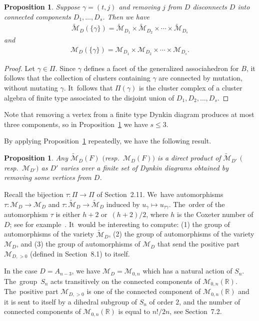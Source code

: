 \documentclass[10pt,a4paper]{amsart}
\def\R{{\mathbb R}}
\def\M{{\mathcal{M}}}
\def\tM{{\widetilde {\mathcal{M}}}}
\numberwithin{equation}{section}
\newtheorem{Proposition}[Theorem]{Proposition}
\begin{document}
\begin{Proposition}\label{prop:divisorsplit}
Suppose $\gamma = (t,j)$ and removing $j$ from $D$ disconnects $D$ into connected components $D_1,\dots,D_s$.
Then we have \begin{gather*}\tM_D(\{\gamma\}) = \tM_{D_1} \times \tM_{D_2} \times \cdots \times \tM_{D_s}\end{gather*} and
\begin{gather*}\M_D(\{\gamma\}) = \M_{D_1} \times \M_{D_2} \times \cdots \times \M_{D_s}.\end{gather*}
\end{Proposition}
\begin{proof}
Let $\gamma \in \Pi$. Since $\gamma$ defines a facet of the generalized associahedron for $B$, it follows that the collection of clusters containing $\gamma$ are connected by mutation, without mutating $\gamma$. It~follows that $\Pi(\gamma)$ is the cluster complex of a cluster algebra of finite type associated to the disjoint union of $D_1,D_2,\dots,D_s$.
\end{proof}
Note that removing a vertex from a finite type Dynkin diagram produces at most three components, so in Proposition~\ref{prop:divisorsplit} we have $s \leq 3$.

By applying Proposition~\ref{prop:divisorsplit} repeatedly, we have the following result.
\begin{Proposition}
Any $\tM_D(F)$ $($resp.\ $\M_D(F))$ is a direct product of $\tM_{D'}$ $($resp.\ $\M_{D'})$ as $D'$ varies over a finite set of Dynkin diagrams obtained by removing some vertices from $D$.
\end{Proposition}

\bigskip{}
Recall the bijection $\tau\colon \Pi \to \Pi$ of Section~2.11. We~have automorphisms $\tau\colon \M_D \to \M_D$ and $\tau\colon \tM_D \to \tM_D$ induced by $u_\gamma \mapsto u_{\tau \gamma}$. The~order of the automorphism $\tau$ is either $h+2$ or~$(h+2)/2$, where $h$ is the Coxeter number of $D$; see for example~\cite{ASS}. It~would be interesting to compute: (1) the group of automorphisms of the variety $\tM_D$, (2) the group of automorphisms of the variety $\M_D$, and (3) the group of automorphisms of $\M_D$ that send the positive part~$\M_{D,>0}$ (defined in Section~8.1) to itself.

In the case $D = A_{n-3}$, we have $\M_D = \M_{0,n}$ which has a natural action of $S_n$. The~group~$S_n$ acts transitively on the connected components of $\M_{0,n}(\R)$. The~positive part $\M_{D,>0}$ is one of the connected component of $\M_{0,n}(\R)$ and it is sent to itself by a dihedral subgroup of $S_n$ of order $2$, and the number of connected components of $\M_{0,n}(\R)$ is equal to $n!/2n$, see Section~7.2.
\end{document}
